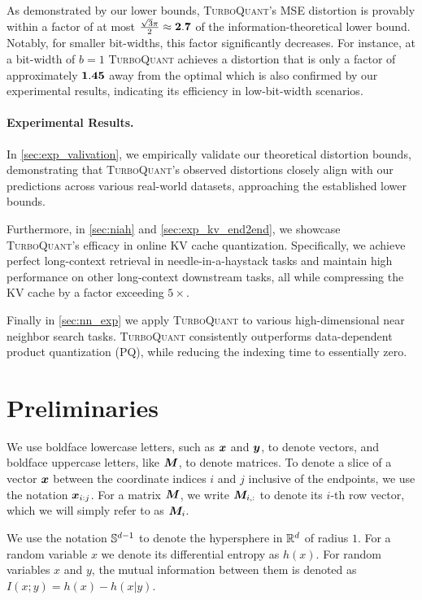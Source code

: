 \documentclass[11pt]{article}
\newcommand{\TurboQuant}{\textsc{TurboQuant}\xspace}
\begin{document}
As demonstrated by our lower bounds, \TurboQuant's MSE distortion is provably within a factor of at most $\frac{\sqrt{3} \pi}{2} \approx {\bf 2.7}$ of the information-theoretical lower bound.
Notably, for smaller bit-widths, this factor significantly decreases. 
For instance, at a bit-width of $b=1$ \TurboQuant achieves a distortion that is only a factor of approximately ${\bf 1.45}$ away from the optimal which is also confirmed by our experimental results, indicating its efficiency in low-bit-width scenarios.

\paragraph{Experimental Results.}
In \cref{sec:exp_valivation}, we empirically validate our theoretical distortion bounds, demonstrating that \TurboQuant's observed distortions closely align with our predictions across various real-world datasets, approaching the established lower bounds.

Furthermore, in \cref{sec:niah} and \cref{sec:exp_kv_end2end}, we showcase \TurboQuant's efficacy in online KV cache quantization. 
Specifically, we achieve perfect long-context retrieval in needle-in-a-haystack tasks and maintain high performance on other long-context downstream tasks, all while compressing the KV cache by a factor exceeding $5 \times$.

Finally in \cref{sec:nn_exp} we apply \TurboQuant to various high-dimensional near neighbor search tasks.
\TurboQuant consistently outperforms data-dependent product quantization (PQ), while reducing the indexing time to essentially zero.


\section{Preliminaries} \label{sec:prelim}
We use boldface lowercase letters, such as ${\bm x}$ and ${\bm y}$, to denote vectors, and boldface uppercase letters, like ${\bm M}$, to denote matrices.
To denote a slice of a vector ${\bm x}$ between the coordinate indices $i$ and $j$ inclusive of the endpoints, we use the notation ${\bm x}_{i:j}$. For a matrix ${\bm M}$, we write ${\bm M}_{i,:}$ to denote its $i$-th row vector, which we will simply refer to as ${\bm M}_i$.

We use the notation $\mathbb{S}^{d-1}$ to denote the hypersphere in $\mathbb{R}^d$ of radius $1$.
For a random variable $x$ we denote its differential entropy as $h(x)$. 
For random variables $x$ and $y$, the mutual information between them is denoted as $I(x; y) = h(x) - h(x|y)$.
\end{document}
